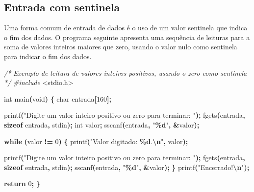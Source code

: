 \documentclass[
  11pt,
  a4paper,
]{scrbook}
\newenvironment{Shaded}{\begin{snugshade}}{\end{snugshade}}
\newcommand{\CommentTok}[1]{\textcolor[rgb]{0.56,0.35,0.01}{\textit{#1}}}
\newcommand{\ControlFlowTok}[1]{\textcolor[rgb]{0.13,0.29,0.53}{\textbf{#1}}}
\newcommand{\DataTypeTok}[1]{\textcolor[rgb]{0.13,0.29,0.53}{#1}}
\newcommand{\DecValTok}[1]{\textcolor[rgb]{0.00,0.00,0.81}{#1}}
\newcommand{\ImportTok}[1]{#1}
\newcommand{\KeywordTok}[1]{\textcolor[rgb]{0.13,0.29,0.53}{\textbf{#1}}}
\newcommand{\NormalTok}[1]{#1}
\newcommand{\OperatorTok}[1]{\textcolor[rgb]{0.81,0.36,0.00}{\textbf{#1}}}
\newcommand{\PreprocessorTok}[1]{\textcolor[rgb]{0.56,0.35,0.01}{\textit{#1}}}
\newcommand{\SpecialCharTok}[1]{\textcolor[rgb]{0.81,0.36,0.00}{\textbf{#1}}}
\newcommand{\StringTok}[1]{\textcolor[rgb]{0.31,0.60,0.02}{#1}}
\begin{document}
\subsection{Entrada com sentinela}\label{entrada-com-sentinela}

Uma forma comum de entrada de dados é o uso de um valor sentinela que
indica o fim dos dados. O programa seguinte apresenta uma sequência de
leituras para a soma de valores inteiros maiores que zero, usando o
valor nulo como sentinela para indicar o fim dos dados.

\begin{Shaded}
\begin{Highlighting}[]
\CommentTok{/*}
\CommentTok{Exemplo de leitura de valores inteiros positivos, usando o zero como sentinela}
\CommentTok{*/}
\PreprocessorTok{\#include }\ImportTok{\textless{}stdio.h\textgreater{}}

\DataTypeTok{int}\NormalTok{ main}\OperatorTok{(}\DataTypeTok{void}\OperatorTok{)} \OperatorTok{\{}
    \DataTypeTok{char}\NormalTok{ entrada}\OperatorTok{[}\DecValTok{160}\OperatorTok{];}

\NormalTok{    printf}\OperatorTok{(}\StringTok{"Digite um valor inteiro positivo ou zero para terminar: "}\OperatorTok{);}
\NormalTok{    fgets}\OperatorTok{(}\NormalTok{entrada}\OperatorTok{,} \KeywordTok{sizeof}\NormalTok{ entrada}\OperatorTok{,}\NormalTok{ stdin}\OperatorTok{);}
    \DataTypeTok{int}\NormalTok{ valor}\OperatorTok{;}
\NormalTok{    sscanf}\OperatorTok{(}\NormalTok{entrada}\OperatorTok{,} \StringTok{"}\SpecialCharTok{\%d}\StringTok{"}\OperatorTok{,} \OperatorTok{\&}\NormalTok{valor}\OperatorTok{);}

    \ControlFlowTok{while} \OperatorTok{(}\NormalTok{valor }\OperatorTok{!=} \DecValTok{0}\OperatorTok{)} \OperatorTok{\{}
\NormalTok{        printf}\OperatorTok{(}\StringTok{"Valor digitado: }\SpecialCharTok{\%d}\StringTok{.}\SpecialCharTok{\textbackslash{}n}\StringTok{"}\OperatorTok{,}\NormalTok{ valor}\OperatorTok{);}

\NormalTok{        printf}\OperatorTok{(}\StringTok{"Digite um valor inteiro positivo ou zero para terminar: "}\OperatorTok{);}
\NormalTok{        fgets}\OperatorTok{(}\NormalTok{entrada}\OperatorTok{,} \KeywordTok{sizeof}\NormalTok{ entrada}\OperatorTok{,}\NormalTok{ stdin}\OperatorTok{);}
\NormalTok{        sscanf}\OperatorTok{(}\NormalTok{entrada}\OperatorTok{,} \StringTok{"}\SpecialCharTok{\%d}\StringTok{"}\OperatorTok{,} \OperatorTok{\&}\NormalTok{valor}\OperatorTok{);}
    \OperatorTok{\}}
\NormalTok{    printf}\OperatorTok{(}\StringTok{"Encerrado!}\SpecialCharTok{\textbackslash{}n}\StringTok{"}\OperatorTok{);}

    \ControlFlowTok{return} \DecValTok{0}\OperatorTok{;}
\OperatorTok{\}}
\end{Highlighting}
\end{Shaded}
\end{document}

